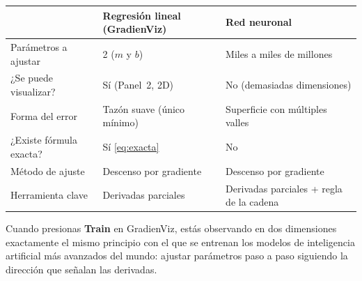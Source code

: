 \documentclass[12pt, a4paper]{article}
\begin{document}
\begin{center}
\small
\begin{tabular}{lll}
    \toprule
    & \textbf{Regresión lineal (GradienViz)} & \textbf{Red neuronal} \\
    \midrule
    Parámetros a ajustar      & 2 ($m$ y $b$)               & Miles a miles de millones \\
    ¿Se puede visualizar?     & Sí (Panel~2, 2D)            & No (demasiadas dimensiones) \\
    Forma del error           & Tazón suave (único mínimo)  & Superficie con múltiples valles \\
    ¿Existe fórmula exacta?   & Sí \eqref{eq:exacta}       & No \\
    Método de ajuste          & Descenso por gradiente      & Descenso por gradiente \\
    Herramienta clave         & Derivadas parciales         & Derivadas parciales + regla de la cadena \\
    \bottomrule
\end{tabular}
\end{center}

\bigskip
Cuando presionas \textbf{Train} en GradienViz, estás observando en dos dimensiones exactamente el mismo principio con el que se entrenan los modelos de inteligencia artificial más avanzados del mundo: ajustar parámetros paso a paso siguiendo la dirección que señalan las derivadas.
\end{document}
